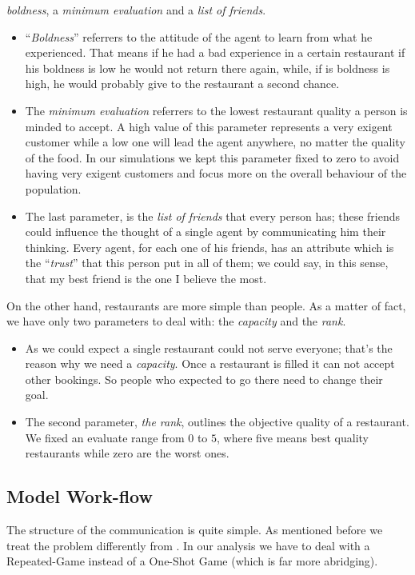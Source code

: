 \documentclass[10pt,a4paper,usenatbib]{article}
\begin{document}
\emph{boldness}, a \emph{minimum evaluation} and a \emph{list of friends}. 
\begin{itemize}
\item ``\emph{Boldness}'' referrers to the attitude of the agent to learn
from what he experienced. That means if he had a bad experience in
a certain restaurant if his boldness is low he would not return there
again, while, if is boldness is high, he would probably give to the
restaurant a second chance. 
\item The \emph{minimum evaluation} referrers to the lowest restaurant quality
a person is minded to accept. A high value of this parameter represents a very exigent customer while
a low one will lead the agent anywhere, no matter the quality of the food. In our simulations we kept this parameter fixed to zero to avoid having very exigent customers and focus more on the overall behaviour of the population.
\item The last parameter, is the \emph{list of friends} that every person
has; these friends could influence the thought of a single agent by
communicating him their thinking. Every agent, for each one of his
friends, has an attribute which is the ``\emph{trust}'' that this
person put in all of them; we could say, in this sense, that my best
friend is the one I believe the most.
\end{itemize}
On the other hand, restaurants are more simple than people. As a matter
of fact, we have only two parameters to deal with: the \textit{capacity} and the
\textit{rank}.
\begin{itemize}
\item As we could expect a single restaurant could not serve everyone; that's
the reason why we need a\emph{ capacity}. Once a restaurant is filled
it can not accept other bookings. So people who expected to go there
need to change their goal. 
\item The second parameter, \emph{the rank}, outlines the objective quality
of a restaurant. We fixed an evaluate range from $0$ to $5$, where five
means best quality restaurants while zero are the worst ones.
\end{itemize}

\subsection{Model Work-flow}

The structure of the communication is quite simple. As mentioned before
we treat the problem differently from \citet{Chakrabarti2009}. In our analysis
we have to deal with a Repeated-Game instead of a One-Shot Game (which
is far more abridging).
\end{document}

